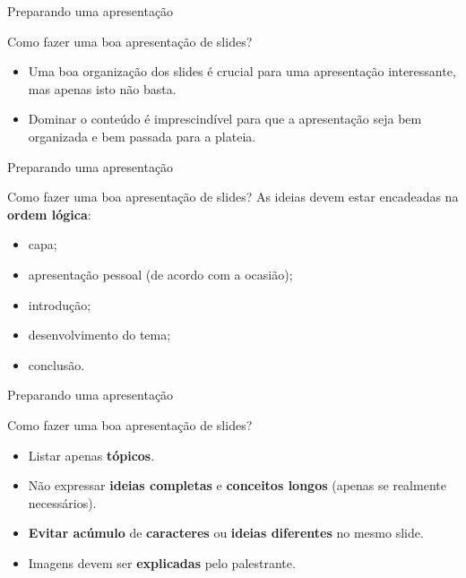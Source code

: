 \begin{frame}{Preparando uma apresentação}
	\begin{block}{Como fazer uma boa apresentação de slides?}
		\begin{itemize}
			\item Uma boa organização dos slides é crucial para uma apresentação interessante, mas apenas isto não basta.
			\item Dominar o conteúdo é imprescindível para que a apresentação seja bem organizada e bem passada para a plateia.
		\end{itemize}
	\end{block}
\end{frame}



\begin{frame}{Preparando uma apresentação}
	\begin{block}{Como fazer uma boa apresentação de slides?}
		As ideias devem estar encadeadas na \textbf{ordem lógica}:
		\begin{itemize}
			\item capa;
			\item apresentação pessoal (de acordo com a ocasião);
			\item introdução;
			\item desenvolvimento do tema;
			\item conclusão.
		\end{itemize}
	\end{block}

\end{frame}



\begin{frame}{Preparando uma apresentação}
	\begin{block}{Como fazer uma boa apresentação de slides?}
		\begin{itemize}
			\item Listar apenas \textbf{tópicos}.
			\item Não expressar \textbf{ideias completas} e \textbf{conceitos longos} (apenas se realmente necessários).
			\item \textbf{Evitar acúmulo} de \textbf{caracteres} ou \textbf{ideias diferentes} no mesmo slide.
			\item Imagens devem ser \textbf{explicadas} pelo palestrante.
		\end{itemize}
	\end{block}

\end{frame}



